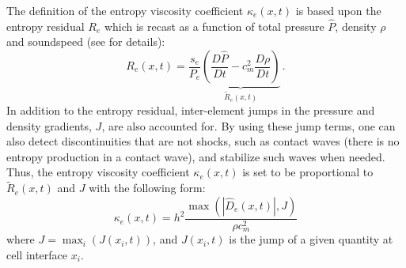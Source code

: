 \documentclass[review]{elsarticle}
\begin{document}
The definition of the entropy viscosity coefficient $\kappa_e(x,t)$ is based upon the entropy residual $R_e$ which is recast as a function of total pressure $\hat{P}$, density $\rho$ and soundspeed (see \cite{our_jcp_radhy_paper} for details):
%
\begin{equation}
\label{eq:equation9}
R_e(x,t) = \frac{s_e}{P_e} \underbrace{ \left( \frac{D\hat{P}}{Dt} - c_m^2 \frac{D\rho}{Dt} \right)}_\textrm{$\tilde{R}_e(x,t)$} \,.
\end{equation}
%
In addition to the entropy residual, inter-element jumps in the pressure and density gradients, $J$, are also accounted for. By using these jump terms, one can also detect discontinuities that are not shocks, such as contact waves (there is no entropy production in a contact wave), and stabilize such waves when needed. \\
Thus, the entropy viscosity coefficient $\kappa_e(x,t)$ is set to be proportional to $\tilde{R}_e(x,t)$ and $J$ with the following form: 
\begin{equation}
\label{eq:equation12}
\kappa_e(x,t) = h^2 \frac{\max (|\hat{D}_e(x,t)|, J)}{\rho c^2_m}
\end{equation} 
where $J = \max_i (J(x_i,t))$, and $J(x_i,t)$ is the jump of a given quantity at cell interface $x_i$. 
\end{document}
